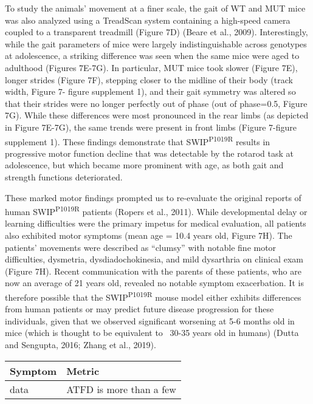 To study the animals’ movement at a finer scale, the gait of WT and MUT mice was
also analyzed using a TreadScan system containing a high-speed camera coupled to
a transparent treadmill (Figure 7D) (Beare et al., 2009). Interestingly, while
the gait parameters of mice were largely indistinguishable across genotypes at
adolescence, a striking difference was seen when the same mice were aged to
adulthood (Figures 7E-7G). In particular, MUT mice took slower (Figure 7E),
longer strides (Figure 7F), stepping closer to the midline of their body (track
width, Figure 7- figure supplement 1), and their gait symmetry was altered so
that their strides were no longer perfectly out of phase (out of phase=0.5,
Figure 7G). While these differences were most pronounced in the rear limbs (as
depicted in Figure 7E-7G), the same trends were present in front limbs (Figure
7-figure supplement 1). These findings demonstrate that SWIP\textsuperscript{P1019R} results in
progressive motor function decline that was detectable by the rotarod task at
adolescence, but which became more prominent with age, as both gait and strength
functions deteriorated.  

These marked motor findings prompted us to re-evaluate the original reports of
human SWIP\textsuperscript{P1019R} patients (Ropers et al., 2011). While developmental delay or
learning difficulties were the primary impetus for medical evaluation, all
patients also exhibited motor symptoms (mean age = 10.4 years old, Figure 7H).
The patients’ movements were described as “clumsy” with notable fine motor
difficulties, dysmetria, dysdiadochokinesia, and mild dysarthria on clinical
exam (Figure 7H). Recent communication with the parents of these patients, who
are now an average of 21 years old, revealed no notable symptom exacerbation. It
is therefore possible that the SWIP\textsuperscript{P1019R} mouse model either exhibits
differences from human patients or may predict future disease progression for
these individuals, given that we observed significant worsening at 5-6 months
old in mice (which is thought to be equivalent to ~30-35 years old in humans)
(Dutta and Sengupta, 2016; Zhang et al., 2019).
\begin{tabularx}{\textwidth}{X|l}
	  \textbf{Symptom} & \textbf{Metric} \\
	  \hline
	  data & ATFD is more than a few\\
\end{tabularx}

